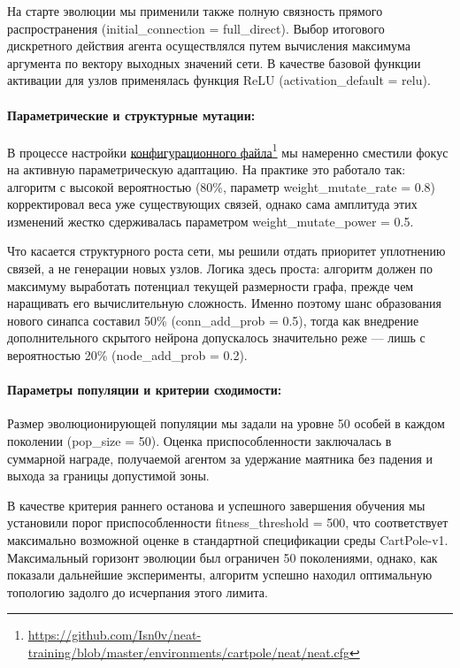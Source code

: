 На старте эволюции мы применили также полную связность прямого распространения (initial\_connection = full\_direct). Выбор итогового дискретного действия агента осуществлялся путем вычисления максимума аргумента по вектору выходных значений сети. В качестве базовой функции активации для узлов применялась функция ReLU (activation\_default = relu).


\paragraph{Параметрические и структурные мутации:}

В процессе настройки \href{https://github.com/Isn0v/neat-training/blob/master/environments/cartpole/neat/neat.cfg}{конфигурационного файла}\footnote{\url{https://github.com/Isn0v/neat-training/blob/master/environments/cartpole/neat/neat.cfg}} мы намеренно сместили фокус на активную параметрическую адаптацию. На практике это работало так: алгоритм с высокой вероятностью (80\%, параметр weight\_mutate\_rate = 0.8) корректировал веса уже существующих связей, однако сама амплитуда этих изменений жестко сдерживалась параметром weight\_mutate\_power = 0.5.

Что касается структурного роста сети, мы решили отдать приоритет уплотнению связей, а не генерации новых узлов. Логика здесь проста: алгоритм должен по максимуму выработать потенциал текущей размерности графа, прежде чем наращивать его вычислительную сложность. Именно поэтому шанс образования нового синапса составил 50\% (conn\_add\_prob = 0.5), тогда как внедрение дополнительного скрытого нейрона допускалось значительно реже — лишь с вероятностью 20\% (node\_add\_prob = 0.2).

\paragraph{Параметры популяции и критерии сходимости:}

Размер эволюционирующей популяции мы задали на уровне 50 особей в каждом поколении (pop\_size = 50). Оценка приспособленности заключалась в суммарной награде, получаемой агентом за удержание маятника без падения и выхода за границы допустимой зоны.

В качестве критерия раннего останова и успешного завершения обучения мы установили порог приспособленности fitness\_threshold = 500, что соответствует максимально возможной оценке в стандартной спецификации среды CartPole-v1. Максимальный горизонт эволюции был ограничен 50 поколениями, однако, как показали дальнейшие эксперименты, алгоритм успешно находил оптимальную топологию задолго до исчерпания этого лимита.


